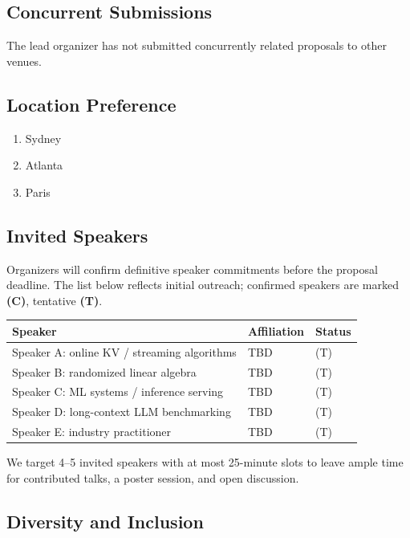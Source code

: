 \documentclass{article}
\begin{document}
\subsection*{Concurrent Submissions}

The lead organizer has not submitted concurrently related proposals to other venues.

\subsection*{Location Preference}

\begin{enumerate}[nosep,leftmargin=1.5em]
  \item Sydney
  \item Atlanta
  \item Paris
\end{enumerate}

\subsection*{Invited Speakers}

Organizers will confirm definitive speaker commitments before the proposal
deadline.  The list below reflects initial outreach; confirmed speakers are
marked \textbf{(C)}, tentative \textbf{(T)}.

\begin{tabular}{lll}
\toprule
Speaker & Affiliation & Status \\
\midrule
Speaker A: online KV / streaming algorithms & TBD & (T) \\
Speaker B: randomized linear algebra        & TBD & (T) \\
Speaker C: ML systems / inference serving   & TBD & (T) \\
Speaker D: long-context LLM benchmarking    & TBD & (T) \\
Speaker E: industry practitioner            & TBD & (T) \\
\bottomrule
\end{tabular}

We target 4--5 invited speakers with at most 25-minute slots to leave ample time
for contributed talks, a poster session, and open discussion.

\subsection*{Diversity and Inclusion}
\end{document}
